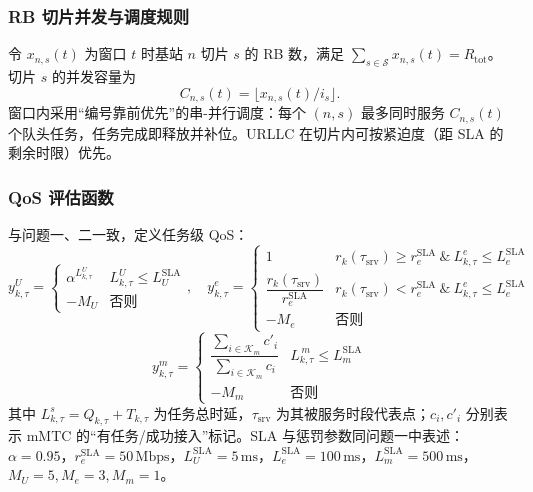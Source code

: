 \subsubsection{RB 切片并发与调度规则}

令 $x_{n,s}(t)$ 为窗口 $t$ 时基站 $n$ 切片 $s$ 的 RB 数，满足 $\sum_{s\in\mathcal{S}}x_{n,s}(t)=R_{\text{tot}}$。切片 $s$ 的并发容量为
\begin{equation}
 C_{n,s}(t)=\big\lfloor x_{n,s}(t)/i_s\big\rfloor.
\end{equation}
窗口内采用“编号靠前优先”的串-并行调度：每个 $(n,s)$ 最多同时服务 $C_{n,s}(t)$ 个队头任务，任务完成即释放并补位。URLLC 在切片内可按紧迫度（距 SLA 的剩余时限）优先。

\subsubsection{QoS 评估函数}

与问题一、二一致，定义任务级 QoS：
\begin{equation}
 y^{U}_{k,\tau}=\begin{cases}
 \alpha^{L^{U}_{k,\tau}} & L^{U}_{k,\tau}\le L^{\text{SLA}}_{U}\\
 -M_U & \text{否则}
 \end{cases},\quad
 y^{e}_{k,\tau}=\begin{cases}
 1 & r_{k}(\tau_\text{srv})\ge r^{\text{SLA}}_{e}\ \&\ L^{e}_{k,\tau}\le L^{\text{SLA}}_{e}\\
 \dfrac{r_{k}(\tau_\text{srv})}{r^{\text{SLA}}_{e}} & r_{k}(\tau_\text{srv})< r^{\text{SLA}}_{e}\ \&\ L^{e}_{k,\tau}\le L^{\text{SLA}}_{e}\\
 -M_e & \text{否则}
 \end{cases}
\end{equation}
\begin{equation}
 y^{m}_{k,\tau}=\begin{cases}
 \dfrac{\sum\limits_{i\in\mathcal{K}_m}c'_i}{\sum\limits_{i\in\mathcal{K}_m}c_i} & L^{\,m}_{k,\tau}\le L^{\text{SLA}}_{m}\\
 -M_m & \text{否则}
 \end{cases}
\end{equation}
其中 $L^{s}_{k,\tau}=Q_{k,\tau}+T_{k,\tau}$ 为任务总时延，$\tau_\text{srv}$ 为其被服务时段代表点；$c_i,c'_i$ 分别表示 mMTC 的“有任务/成功接入”标记。SLA 与惩罚参数同问题一中表述：$\alpha=0.95$，$r^{\text{SLA}}_e=50\,\mathrm{Mbps}$，$L^{\text{SLA}}_{U}=5\,\mathrm{ms}$，$L^{\text{SLA}}_{e}=100\,\mathrm{ms}$，$L^{\text{SLA}}_{m}=500\,\mathrm{ms}$，$M_U=5, M_e=3, M_m=1$。

